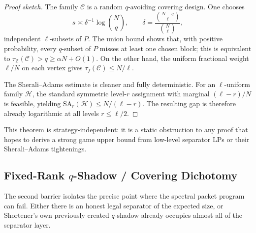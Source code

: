 \begin{proof}[Proof sketch]
The family $\mathcal C$ is a random $q$-avoiding covering design.  One chooses
\[
s\asymp \delta^{-1}\log \binom{N}{q},
\qquad
\delta=\frac{\binom{N-q}{\ell}}{\binom{N}{\ell}},
\]
independent $\ell$-subsets of $P$.  The union bound shows that, with positive
probability, every $q$-subset of $P$ misses at least one chosen block; this is
equivalent to $\tau_{\mathbb Z}(\mathcal C)>q\ge \alpha N+O(1)$.  On the other
hand, the uniform fractional weight $\ell/N$ on each vertex gives
$\tau_f(\mathcal C)\le N/\ell$.

The Sherali--Adams estimate is cleaner and fully deterministic.  For an
$\ell$-uniform family $\mathcal H$, the standard symmetric level-$r$ assignment
with marginal $(\ell-r)/N$ is feasible, yielding
$\mathrm{SA}_r(\mathcal H)\le N/(\ell-r)$.  The resulting gap is therefore
already logarithmic at all levels $r\le \ell/2$.
\end{proof}

\begin{remark}
This theorem is strategy-independent: it is a static obstruction to any proof
that hopes to derive a strong game upper bound from low-level separator LPs or
their Sherali--Adams tightenings.
\end{remark}

\subsection{Fixed-Rank $q$-Shadow / Covering Dichotomy}

The second barrier isolates the precise point where the spectral packet program
can fail.  Either there is an honest legal separator of the expected size, or
Shortener's own previously created $q$-shadow already occupies almost all of
the separator layer.

